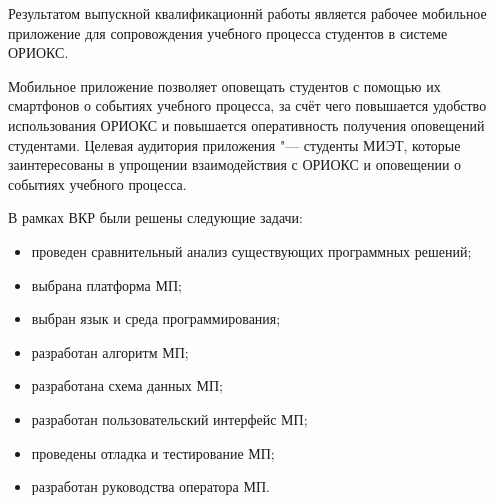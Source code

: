 \Conclusion %

Результатом выпускной квалификационнй работы является рабочее мобильное приложение для сопровождения учебного процесса студентов в системе ОРИОКС.

Мобильное приложение позволяет оповещать студентов с помощью их смартфонов о событиях учебного процесса, за счёт чего повышается удобство использования ОРИОКС и повышается оперативность получения оповещений студентами.
Целевая аудитория приложения "--- студенты МИЭТ, которые заинтересованы в упрощении взаимодействия с ОРИОКС и оповещении о событиях учебного процесса.

В рамках ВКР были решены следующие задачи:
\begin{itemize}
  \item проведен сравнительный анализ существующих программных решений;
  \item выбрана платформа МП;
  \item выбран язык и среда программирования;
  \item разработан алгоритм МП;
  \item разработана схема данных МП;
  \item разработан пользовательский интерфейс МП;
  \item проведены отладка и тестирование МП;
  \item разработан руководства оператора МП.
\end{itemize}
